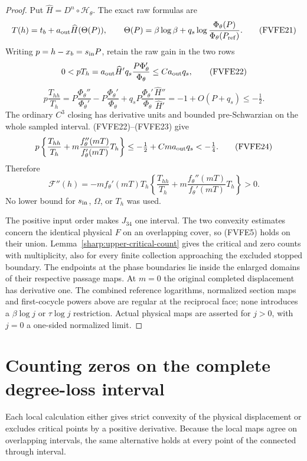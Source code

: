 \begin{proof}
Put \(\widehat H=D^n\circ\mathcal H_\theta\). The exact raw formulas are
\[
 T(h)=t_b+a_{\rm out}\widehat H(\Theta(P)),\qquad
 \Theta(P)=\beta\log\beta+
       q_s\log{\frac{\Phi_\theta(P)}{\Phi_\theta(P_{\rm ref})}}.
 \tag{FVFE21}
\]
Writing \(p=h-x_b=s_{\rm in}P\), retain the raw gain in the two rows
\[
 0<pT_h=
 a_{\rm out}\widehat H' q_s{\frac{P\Phi_\theta'}{\Phi_\theta}}
       \le C a_{\rm out}q_s ,
 \tag{FVFE22}
\]
\[
 p{\frac{T_{hh}}{T_h}}
 =P{\frac{\Phi_\theta''}{\Phi_\theta'}}
       -P{\frac{\Phi_\theta'}{\Phi_\theta}}
       +q_sP{\frac{\Phi_\theta'}{\Phi_\theta}}
                    {\frac{\widehat H''}{\widehat H'}}
 =-1+O(P+q_s)\le-\tfrac12 .
 \tag{FVFE23}
\]
The ordinary $C^3$ closing has derivative units and bounded
pre-Schwarzian on the whole sampled interval. (FVFE22)--(FVFE23) give
\[
 p\left\{{\frac{T_{hh}}{T_h}}
       +m{\frac{f_\theta''(mT)}{f_\theta'(mT)}}T_h\right\}
 \le-\tfrac12+Cma_{\rm out}q_s<-\tfrac14 .
 \tag{FVFE24}
\]
Therefore
\[
 \mathcal F''(h)=
 -mf_\theta'(mT)T_h
 \left\{{\frac{T_{hh}}{T_h}}
       +m{\frac{f_\theta''(mT)}{f_\theta'(mT)}}T_h\right\}>0 .
 \tag{FVFE25}
\]
No lower bound for \(s_{\rm in}\), \(\Omega\), or \(T_h\) was used.

The positive input order makes \(J_{34}\) one interval.
The two convexity estimates concern the identical physical \(F\)
on an overlapping cover, so (FVFE5) holds on their union.
Lemma~\ref{sharp:upper-critical-count} gives the critical and zero
counts with multiplicity, also for every finite collection approaching
the excluded stopped boundary.
The endpoints at the phase boundaries lie inside the enlarged domains
of their respective passage maps.
At \(m=0\) the original completed displacement has derivative one.
The combined reference logarithms, normalized section maps and
first-cocycle powers above are regular at the reciprocal face; none introduces a
\(\beta\log j\) or \(\tau\log j\) restriction. Actual physical maps
are asserted for \(j>0\), with \(j=0\) a one-sided normalized limit.
\end{proof}

\section{Counting zeros on the complete degree-loss interval}

Each local calculation either gives strict convexity of the physical
displacement or excludes critical points by a positive derivative.
Because the local maps agree on overlapping intervals, the same
alternative holds at every point of the connected through interval.

